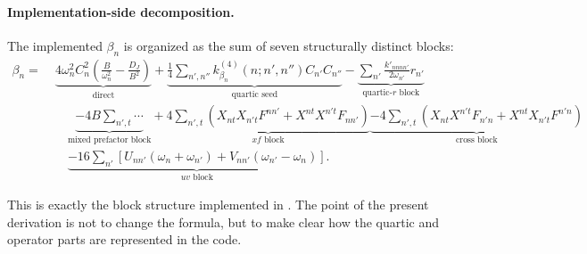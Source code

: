 \documentclass[11pt]{article}
\begin{document}
\paragraph{Implementation-side decomposition.}
The implemented $\beta_n$ is organized as the sum of seven structurally
distinct blocks:
\begin{align*}
\beta_n
=\;&
\underbrace{4\omega_n^2 C_n^2\left(\frac{B}{\omega_n^2}-\frac{D_J}{B^2}\right)}_{\text{direct}}
+\underbrace{\frac{1}{4}\sum_{n',n''} k^{(4)}_{\beta_n}(n;n',n'') C_{n'}C_{n''}}_{\text{quartic seed}}
-\underbrace{\sum_{n'} \frac{k'_{nnnn'}}{2\omega_{n'}} r_{n'}}_{\text{quartic-$r$ block}}
\\[0.4em]
&\quad
\underbrace{- 4B\sum_{n',t} \cdots}_{\text{mixed prefactor block}}
+\underbrace{4\sum_{n',t}\left(X_{nt}X_{n't}F^{nn'} + X^{nt}X^{n't}F_{nn'}\right)}_{\text{$xf$ block}}
\underbrace{- 4\sum_{n',t}\left(X_{nt}X^{n't}F_{n'n} + X^{nt}X_{n't}F^{n'n}\right)}_{\text{cross block}}
\\[0.4em]
&\quad
\underbrace{- 16\sum_{n'}
\left[U_{nn'}(\omega_n+\omega_{n'}) + V_{nn'}(\omega_{n'}-\omega_n)\right]}_{\text{$uv$ block}}.
\end{align*}

This is exactly the block structure implemented in
. The point of
the present derivation is not to change the formula, but to make clear how the
quartic and operator parts are represented in the code.
\end{document}
